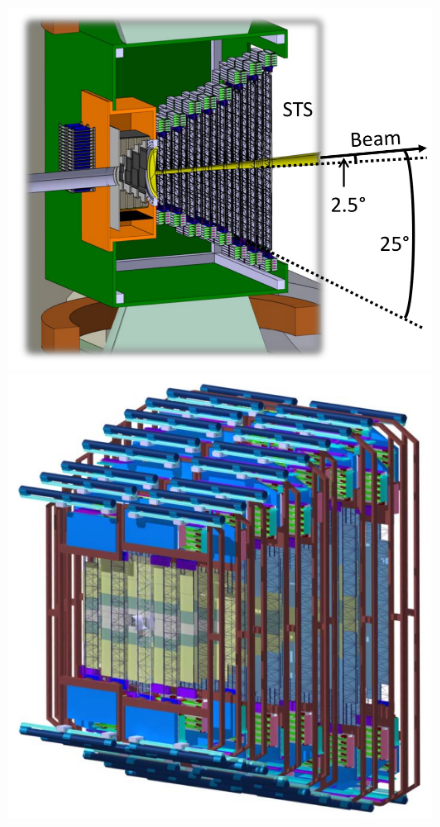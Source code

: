 \begin{figure}[H]
\begin{minipage}[b]{0.495\textwidth}
\includegraphics[width=1.0\textwidth]{pictures/STS_1.png}
\end{minipage}
\hspace{0.01\textwidth}
\begin{minipage}[b]{0.495\textwidth}
\includegraphics[width=1.0\textwidth]{pictures/STS_3.png}
\end{minipage}
\caption{}
\label{fig:STS12}
\end{figure}

